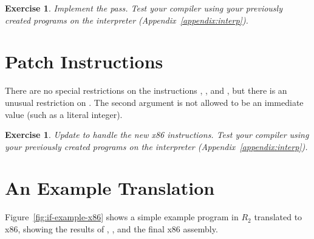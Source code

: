 \documentclass[11pt]{book}
\newtheorem{exercise}[theorem]{Exercise}
\begin{document}
\begin{exercise}\normalfont
Implement the  pass. Test your compiler using
your previously created programs on the  interpreter
(Appendix~\ref{appendix:interp}).
\end{exercise}

\section{Patch Instructions}

There are no special restrictions on the instructions ,
, and , but there is an unusual restriction on
. The second argument is not allowed to be an immediate
value (such as a literal integer).

\begin{exercise}\normalfont
Update  to handle the new x86 instructions.
Test your compiler using your previously created programs on the
 interpreter (Appendix~\ref{appendix:interp}).
\end{exercise}


\section{An Example Translation}


Figure~\ref{fig:if-example-x86} shows a simple example program in
$R_2$ translated to x86, showing the results of ,
, and the final x86 assembly.
\end{document}
